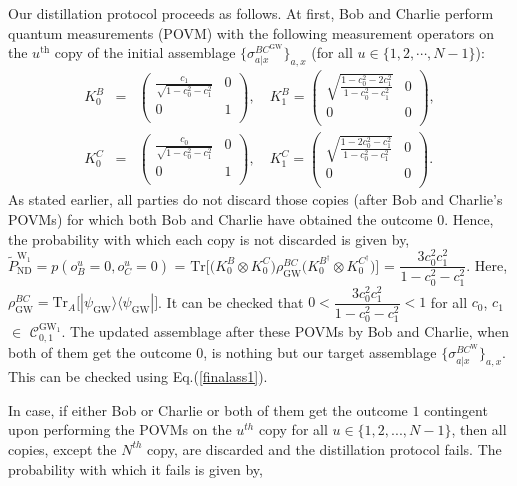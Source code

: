 \documentclass[reprint,superscriptaddress,nofootinbib,amsmath,amssymb,aps,pra,longbibliography]{revtex4-1}
\begin{document}
Our distillation protocol proceeds as follows. At first, Bob and Charlie perform quantum measurements (POVM) with the following measurement operators on the $u^{\text{th}}$ copy of the initial assemblage $\{\sigma_{a|x}^{BC^{\text{GW}}}\}_{a,x}$ (for all $u \in \{1, 2, \cdots, N-1\}$):
\begin{eqnarray}
	K_{0}^{B} &=& \left(
\begin{array}{cc}
 \frac{c_1}{\sqrt{1-c_0^2-c_1^2}} & 0 \\
 0 & 1 \\
\end{array}
\right), \quad K_{1}^{B} =  \left(
\begin{array}{cc}
\sqrt{\frac{1-c_0^2-2c_1^2}{1-c_0^2-c_1^2}} & 0 \\
 0 & 0 \\
\end{array}
\right), \nonumber  \\
K_{0}^{C} &=& \left(
\begin{array}{cc}
 \frac{c_0}{\sqrt{1-c_0^2-c_1^2}} & 0 \\
 0 & 1 \\
\end{array}
\right), \quad K_{1}^{C} =  \left(
\begin{array}{cc}
 \sqrt{\frac{1-2c_0^2-c_1^2}{1-c_0^2-c_1^2}} & 0 \\
 0 & 0 \\
\end{array}
\right) .
\label{Wsteer1}
\end{eqnarray}
As stated earlier, all parties do not discard those copies (after Bob and Charlie's POVMs) for which both Bob and Charlie have obtained the outcome $0$. Hence, the probability with which each copy is not discarded is given by, $\tilde{P}^{\text{W}_1}_{\text{ND}} = p( o_B^u = 0, o_C^u = 0)$ = $\text{Tr} \Big[ \Big(K_{0}^{B} \otimes K_{0}^{C} \Big) \rho_{\text{GW}}^{BC} \Big(K_{0}^{B^{\dagger}} \otimes K_{0}^{C^{\dagger}} \Big) \Big]$ = $\dfrac{3 c_0^2 c_1^2}{ 1-c_0^2-c_1^2}$. Here, $\rho_{\text{GW}}^{BC} = \text{Tr}_{A}\Big[ |\psi_{\text{GW}} \rangle \langle \psi_{\text{GW}}|\Big]$. It can be checked that $0 < \dfrac{3 c_0^2 c_1^2}{ 1-c_0^2-c_1^2} < 1$ for all $c_0$, $c_1$ $\in$ $\mathcal{C}^{\text{GW}_1}_{0,1}$. The updated assemblage after these POVMs by Bob and Charlie, when both of them get the outcome $0$, is nothing but our target assemblage $\{\sigma_{a|x}^{BC^{\text{W}}}\}_{a,x}$. This can be checked using Eq.(\ref{finalass1}).

In case, if either Bob or Charlie or both of them get the outcome $1$ contingent upon performing the POVMs on the $u^{th}$ copy for all $u \in \{1, 2, ..., N-1\}$, then all copies, except the $N^{th}$ copy, are discarded and the distillation protocol fails. The probability with which it fails is given by,
\end{document}
